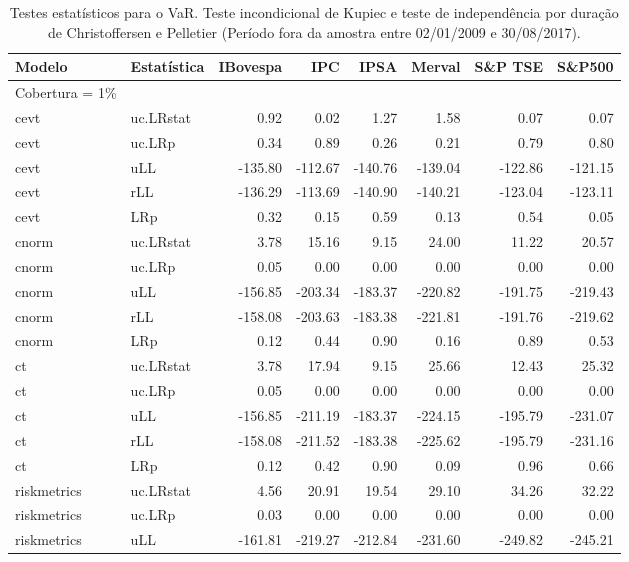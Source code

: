 \begin{longtable}{llrrrrrr}
\caption{Testes estatísticos para o VaR. Teste incondicional de Kupiec e teste de
             independência por duração de Christoffersen e Pelletier (Período fora da 
             amostra entre 02/01/2009 e 30/08/2017).} \\ 
  \hline
Modelo & Estatística & IBovespa & IPC & IPSA & Merval & S\&P TSE & S\&P500 \\ 
  \hline
Cobertura = 1\% &  &  &  &  &  &  &  \\ 
  cevt & uc.LRstat & 0.92 & 0.02 & 1.27 & 1.58 & 0.07 & 0.07 \\ 
  cevt & uc.LRp & 0.34 & 0.89 & 0.26 & 0.21 & 0.79 & 0.80 \\ 
  cevt & uLL & -135.80 & -112.67 & -140.76 & -139.04 & -122.86 & -121.15 \\ 
  cevt & rLL & -136.29 & -113.69 & -140.90 & -140.21 & -123.04 & -123.11 \\ 
  cevt & LRp & 0.32 & 0.15 & 0.59 & 0.13 & 0.54 & 0.05 \\ 
  cnorm & uc.LRstat & 3.78 & 15.16 & 9.15 & 24.00 & 11.22 & 20.57 \\ 
  cnorm & uc.LRp & 0.05 & 0.00 & 0.00 & 0.00 & 0.00 & 0.00 \\ 
  cnorm & uLL & -156.85 & -203.34 & -183.37 & -220.82 & -191.75 & -219.43 \\ 
  cnorm & rLL & -158.08 & -203.63 & -183.38 & -221.81 & -191.76 & -219.62 \\ 
  cnorm & LRp & 0.12 & 0.44 & 0.90 & 0.16 & 0.89 & 0.53 \\ 
  ct & uc.LRstat & 3.78 & 17.94 & 9.15 & 25.66 & 12.43 & 25.32 \\ 
  ct & uc.LRp & 0.05 & 0.00 & 0.00 & 0.00 & 0.00 & 0.00 \\ 
  ct & uLL & -156.85 & -211.19 & -183.37 & -224.15 & -195.79 & -231.07 \\ 
  ct & rLL & -158.08 & -211.52 & -183.38 & -225.62 & -195.79 & -231.16 \\ 
  ct & LRp & 0.12 & 0.42 & 0.90 & 0.09 & 0.96 & 0.66 \\ 
  riskmetrics & uc.LRstat & 4.56 & 20.91 & 19.54 & 29.10 & 34.26 & 32.22 \\ 
  riskmetrics & uc.LRp & 0.03 & 0.00 & 0.00 & 0.00 & 0.00 & 0.00 \\ 
  riskmetrics & uLL & -161.81 & -219.27 & -212.84 & -231.60 & -249.82 & -245.21 \\ 

\end{longtable}
